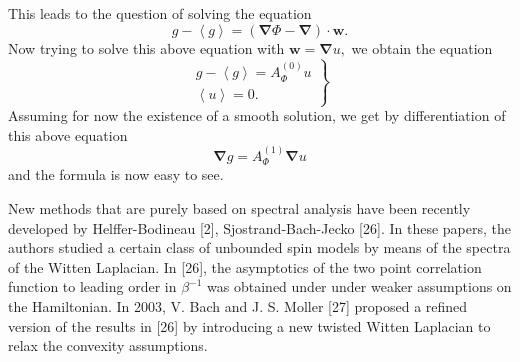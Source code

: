 \documentclass{article}
\begin{document}
This leads to the question of solving the equation%
\begin{equation}
g-\left\langle g\right\rangle =(\mathbf{\nabla }\Phi -\mathbf{\nabla })\cdot 
\mathbf{w.}
\end{equation}%
Now trying to solve this above equation with $\mathbf{w}=\mathbf{\nabla }u,$
we obtain the equation%
\begin{equation}
\left. 
\begin{array}{c}
g-\left\langle g\right\rangle =A_{\Phi }^{(0)}u \\ 
\left\langle u\right\rangle =0.%
\end{array}%
\right\}
\end{equation}%
Assuming for now the existence of a smooth solution, we get by
differentiation of this above equation 
\begin{equation}
\mathbf{\nabla }g=A_{\Phi }^{(1)}\mathbf{\nabla }u
\end{equation}%
and the formula is now easy to see.

New methods that are purely based on spectral analysis have been recently
developed by Helffer-Bodineau [2], Sjostrand-Bach-Jecko [26]. In these
papers, the authors studied a certain class of unbounded spin models by
means of the spectra of the Witten Laplacian. In [26], the asymptotics of
the two point correlation function to leading order in $\beta ^{-1}$ was
obtained under under weaker assumptions on the Hamiltonian. In 2003, V. Bach
and J. S. Moller [27] proposed a refined version of the results in [26] by
introducing a new twisted Witten Laplacian to relax the convexity
assumptions.
\end{document}
